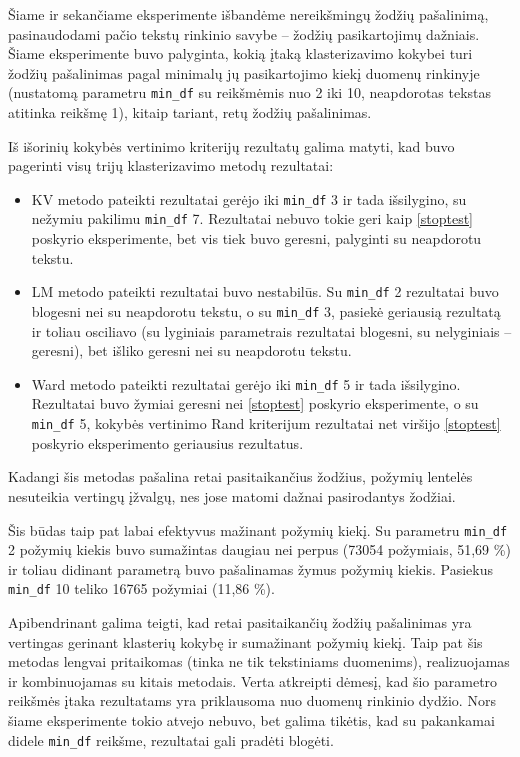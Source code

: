 \documentclass{VUMIFInfBakalaurinis}
\begin{document}
Šiame ir sekančiame eksperimente išbandėme nereikšmingų žodžių
pašalinimą, pasinaudodami pačio tekstų rinkinio savybe -- žodžių
pasikartojimų dažniais. Šiame eksperimente buvo palyginta, kokią įtaką
klasterizavimo kokybei turi žodžių pašalinimas pagal minimalų jų
pasikartojimo kiekį duomenų rinkinyje (nustatomą parametru
\texttt{min\_df} su reikšmėmis nuo 2 iki 10, neapdorotas tekstas
atitinka reikšmę 1), kitaip tariant, retų žodžių pašalinimas.

Iš išorinių kokybės vertinimo kriterijų rezultatų galima matyti, kad buvo pagerinti
visų trijų klasterizavimo metodų rezultatai:

\begin{itemize}
\item
  KV metodo pateikti rezultatai gerėjo iki \texttt{min\_df} 3 ir tada išsilygino, su
  nežymiu pakilimu \texttt{min\_df} 7. Rezultatai nebuvo tokie geri kaip
  \ref{stoptest} poskyrio eksperimente, bet vis tiek buvo geresni, palyginti su
  neapdorotu tekstu.
\item
  LM metodo pateikti rezultatai buvo nestabilūs. Su \texttt{min\_df} 2 rezultatai buvo
  blogesni nei su neapdorotu tekstu, o su \texttt{min\_df} 3, pasiekė geriausią
  rezultatą ir toliau osciliavo (su lyginiais parametrais rezultatai
  blogesni, su nelyginiais -- geresni), bet išliko geresni nei su
  neapdorotu tekstu.
\item
  Ward metodo pateikti rezultatai gerėjo iki \texttt{min\_df} 5 ir tada išsilygino.
  Rezultatai buvo žymiai geresni nei \ref{stoptest} poskyrio eksperimente, o su
  \texttt{min\_df} 5, kokybės vertinimo Rand kriterijum rezultatai net viršijo \ref{stoptest} poskyrio eksperimento
  geriausius rezultatus.
\end{itemize}

Kadangi šis metodas pašalina retai pasitaikančius žodžius, požymių
lentelės nesuteikia vertingų įžvalgų, nes jose matomi dažnai
pasirodantys žodžiai.

Šis būdas taip pat labai efektyvus mažinant požymių kiekį. Su parametru
\texttt{min\_df} 2 požymių kiekis buvo sumažintas daugiau nei perpus (73054
požymiais, 51,69 \%) ir toliau didinant parametrą buvo pašalinamas žymus
požymių kiekis. Pasiekus \texttt{min\_df} 10 teliko 16765 požymiai (11,86 \%).

Apibendrinant galima teigti, kad retai pasitaikančių žodžių pašalinimas
yra vertingas gerinant klasterių kokybę ir sumažinant požymių kiekį.
Taip pat šis metodas lengvai pritaikomas (tinka ne tik tekstiniams
duomenims), realizuojamas ir kombinuojamas su kitais metodais. Verta
atkreipti dėmesį, kad šio parametro reikšmės įtaka rezultatams yra
priklausoma nuo duomenų rinkinio dydžio. Nors šiame eksperimente tokio
atvejo nebuvo, bet galima tikėtis, kad su pakankamai didele
\texttt{min\_df} reikšme, rezultatai gali pradėti blogėti.
\end{document}
